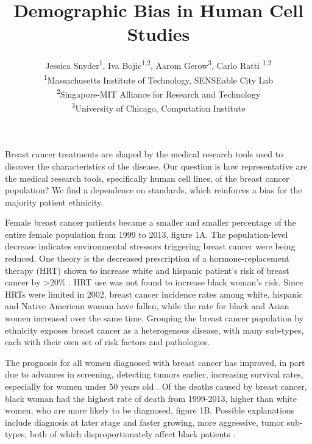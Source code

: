 \documentclass[10pt]{article}
\begin{document}
\title{Demographic Bias in Human Cell Studies }
\author{Jessica Snyder\textsuperscript{1}, Iva Bojic\textsuperscript{1,2}, Aarom Gerow\textsuperscript{3}, Carlo Ratti  \textsuperscript{1,2 } \\ \textsuperscript{1}Massachusetts Institute of Technology, SENSEable City Lab \\ \textsuperscript{2}Singapore-MIT Alliance for Research and Technology \\  \textsuperscript{3}University of Chicago, Computation Institute }

\maketitle 

\begin{multicols}{2}
Breast cancer treatments are shaped by the medical research tools used to discover the characteristics of the disease. Our question is how representative are the medical research tools, specifically human cell lines, of the breast cancer population? We find a dependence on standards, which reinforces a bias for the majority patient ethnicity. 

Female breast cancer patients became a smaller and smaller percentage of the entire female population from 1999 to 2013, figure 1A. The population-level decrease indicates environmental stressors triggering breast cancer were being reduced. One theory is the decreased prescription of a hormone-replacement therapy (HRT) shown to increase white and hispanic patient's risk of breast cancer by >20\% \cite{million2003breast}. HRT use was not found to increase black woman's risk. Since HRTs were limited in 2002, breast cancer incidence rates among white, hispanic and Native American woman have fallen, while the rate for black and Asian women increased over the same time. Grouping the breast cancer population by ethnicity exposes breast cancer as a heterogenous disease, with many sub-types, each with their own set of risk factors and pathologies. 

The prognosis for all women diagnosed with breast cancer has improved, in part due to advances in screening, detecting tumors earlier, increasing survival rates, especially for women under 50 years old \cite{etzioni2003case}. Of the deaths caused by breast cancer, black woman had the highest rate of death from 1999-2013, higher than white women, who are more likely to be diagnosed, figure 1B. Possible explanations include diagnosis at later stage and faster growing, more aggressive, tumor sub-types, both of which disproportionately affect black patients \cite{batina2013variation}. 


\end{multicols}
\end{document}
